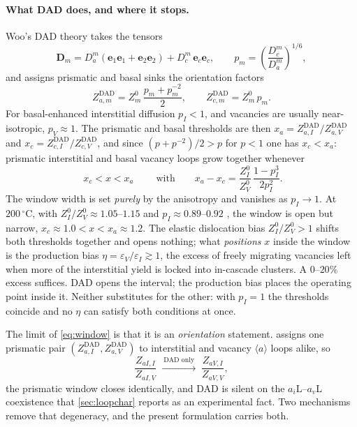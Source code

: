 \documentclass{article}
\newcommand{\aloop}{\ensuremath{\langle a\rangle}}
\newcommand{\aiL}{a_{i}\mathrm{L}}
\newcommand{\avL}{a_{v}\mathrm{L}}
\newcommand{\Zdad}{Z^{\mathrm{DAD}}}
\newcommand{\Dten}{\bm D}
\begin{document}
\paragraph{What DAD does, and where it stops.} Woo's DAD theory takes the
tensors
\begin{equation}
  \Dten_m=D_a^m(\bm e_1\bm e_1+\bm e_2\bm e_2)+D_c^m\,\bm e_c\bm e_c,
  \qquad
  p_m=\left(\frac{D_c^m}{D_a^m}\right)^{1/6},
  \label{eq:pm}
\end{equation}
and assigns prismatic and basal sinks the orientation factors
\begin{equation}
  \Zdad_{a,m}=Z^0_m\,\frac{p_m+p_m^{-2}}{2},
  \qquad
  \Zdad_{c,m}=Z^0_m\,p_m .
  \label{eq:Zdad}
\end{equation}
For basal-enhanced interstitial diffusion $p_I<1$, and vacancies are usually
near-isotropic, $p_V\approx1$. The prismatic and basal thresholds are then
$x_a=\Zdad_{a,I}/\Zdad_{a,V}$ and $x_c=\Zdad_{c,I}/\Zdad_{c,V}$, and since
$(p+p^{-2})/2>p$ for $p<1$ one has $x_c<x_a$: prismatic interstitial and basal
vacancy loops grow together whenever
\begin{equation}
  \boxed{\;x_c<x<x_a\;}
  \qquad\text{with}\qquad
  x_a-x_c=\frac{Z^0_I}{Z^0_V}\,\frac{1-p_I^3}{2p_I^2}.
  \label{eq:window}
\end{equation}
The window width is set \emph{purely} by the anisotropy and vanishes as
$p_I\to1$. At $200\,^\circ$C, with $Z^0_I/Z^0_V\approx1.05$--$1.15$ and
$p_I\approx0.89$--$0.92$
\citep{woo1988theory,christien2009cluster,barashev2015theoretical,li2020coupled},
the window is open but narrow, $x_c\approx1.0<x<x_a\approx1.2$. The elastic
dislocation bias $Z^0_I/Z^0_V>1$ shifts both thresholds together and opens
nothing; what \emph{positions} $x$ inside the window is the production bias
$\eta=\varepsilon_V/\varepsilon_I\gtrsim1$, the excess of freely migrating
vacancies left when more of the interstitial yield is locked into in-cascade
clusters. A $0$--$20\%$ excess suffices. DAD opens the interval; the production
bias places the operating point inside it. Neither substitutes for the other:
with $p_I=1$ the thresholds coincide and no $\eta$ can satisfy both conditions
at once.

The limit of \cref{eq:window} is that it is an \emph{orientation} statement.
 assigns one prismatic pair $(\Zdad_{a,I},\Zdad_{a,V})$ to
interstitial and vacancy \aloop{} loops alike, so
\begin{equation}
  \frac{Z_{aI,I}}{Z_{aI,V}}
  \;\xrightarrow{\ \text{DAD only}\ }\;
  \frac{Z_{aV,I}}{Z_{aV,V}},
  \label{eq:dad-degenerate}
\end{equation}
the prismatic window closes identically, and DAD is silent on the
$\aiL$--$\avL$ coexistence that \cref{sec:loopchar} reports as an experimental
fact. Two mechanisms remove that degeneracy, and the present formulation carries
both.
\end{document}
